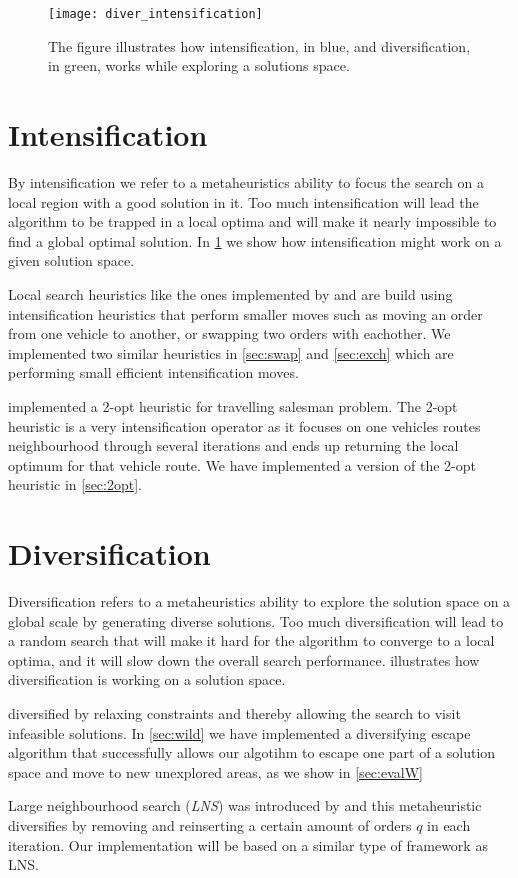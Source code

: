 \documentclass[../main.tex]{subfiles}
\begin{document}
\begin{figure}
    \centering
    \texttt{[image: diver\_intensification]}
    \caption{The figure illustrates how intensification, in blue, and diversification, in green, works while exploring a solutions space.}
    \label{fig:sification}
\end{figure}

\section{Intensification}
\label{sec:intens}
By intensification we refer to a metaheuristics ability to focus the search on a local region with a good solution in it. 
Too much intensification will lead the algorithm to be trapped in a local optima and will make it nearly impossible to find a global optimal solution. 
In \cref{fig:sification} we show how intensification might work on a given solution space. \par

Local search heuristics like the ones implemented by \cite{nanry00} and \cite{li03} are build using intensification heuristics that perform smaller moves such as moving an order from one vehicle to another, or swapping two orders with eachother. 
We implemented two similar heuristics in \cref{sec:swap} and \cref{sec:exch} which are performing small efficient intensification moves. \par
\cite{lin65} implemented a 2-opt heuristic for travelling salesman problem. The 2-opt heuristic is a very intensification operator as it focuses on one vehicles routes neighbourhood through several iterations and ends up returning the local optimum for that vehicle route. We have implemented a version of the 2-opt heuristic in \cref{sec:2opt}.

\section{Diversification}
\label{sec:divers}
Diversification refers to a metaheuristics ability to explore the solution space on a global scale by generating diverse solutions. 
Too much diversification will lead to a random search that will make it hard for the algorithm to converge to a local optima, and it will slow down the overall search performance. 
 illustrates how diversification is working on a solution space. \par

\cite{cordeau01} diversified by relaxing constraints and thereby allowing the search to visit infeasible solutions. In \cref{sec:wild} we have implemented a diversifying escape algorithm that successfully allows our algotihm to escape one part of a solution space and move to new unexplored areas, as we show in \cref{sec:evalW} \par
Large neighbourhood search (\textit{LNS}) was introduced by \cite{shaw97} and this metaheuristic diversifies by removing and reinserting a certain amount of orders $q$ in each iteration. 
Our implementation will be based on a similar type of framework as LNS.
\end{document}
